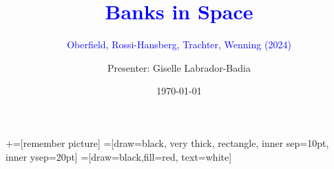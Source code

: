 \documentclass[notes,10pt, aspectratio=169]{beamer}
\title[]{\textcolor{blue}{Banks in Space }} %
\subtitle{\textcolor{blue}{Oberfield, Rossi-Hansberg, Trachter, Wenning (2024)} }
\author{Presenter: Giselle Labrador-Badia}
\institute{University of Wisconsin-Madison}
\date{\today}
\begin{document}
\newcommand\marktopleft[1]{%
 \tikz[overlay,remember picture] 
 \node (marker-#1-a) at (-.3em,.3em) {};%
}
\newcommand\markbottomright[2]{%
 \tikz[overlay,remember picture] 
 \node (marker-#1-b) at (0em,0em) {};%
}
+=[remember picture] 
 =[draw=black, very thick, rectangle, inner sep=10pt, inner ysep=20pt]
 =[draw=black,fill=red, text=white]

\begin{frame}[noframenumbering]
 \maketitle
\end{frame}
\end{document}
